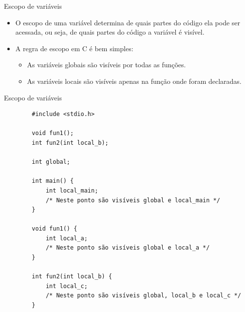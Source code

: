 \documentclass[handout]{beamer}
\begin{document}
\begin{frame}{Escopo de variáveis}

    \begin{itemize}
        \item O \alert{escopo} de uma variável determina de quais partes do código ela pode ser acessada, ou seja, de quais partes do código a variável é visível.
        \item A regra de escopo em C é bem simples:
        \begin{itemize}
            \item As variáveis globais são visíveis por todas as funções.
            \item As variáveis locais são visíveis apenas na função onde foram declaradas.
        \end{itemize}
    \end{itemize}
\end{frame}

\begin{frame}[fragile]{Escopo de variáveis}

    \begin{verbatim}
        #include <stdio.h>

        void fun1();
        int fun2(int local_b);

        int global;

        int main() {
            int local_main;
            /* Neste ponto são visíveis global e local_main */
        }

        void fun1() {
            int local_a;
            /* Neste ponto são visíveis global e local_a */
        }
    
        int fun2(int local_b) {
            int local_c;
            /* Neste ponto são visíveis global, local_b e local_c */
        }
    \end{verbatim}
\end{frame}
\end{document}
